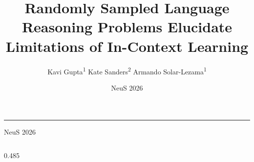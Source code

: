 \documentclass[final]{beamer}
\title{Randomly Sampled Language Reasoning Problems Elucidate Limitations of In-Context Learning}
\author{Kavi Gupta\textsuperscript{1} \quad Kate Sanders\textsuperscript{2} \quad Armando Solar-Lezama\textsuperscript{1}}
\institute{\textsuperscript{1}MIT CSAIL \qquad \textsuperscript{2}Johns Hopkins University}
\date{NeuS 2026}
\begin{document}
\begin{frame}[t]

\begin{center}
  {\inserttitle\par}
  \vspace{0.4em}
  {\color{evallmHighlight}\rule{\textwidth}{4pt}}
  \vspace{0.5em}
  {\large\insertauthor \quad\textbar\quad \insertinstitute \quad\textbar\quad NeuS 2026\par}
\end{center}
\vspace{0.8em}

\newlength{\colht}\setlength{\colht}{0.80\paperheight}

\begin{columns}[t, totalwidth=\textwidth]

\begin{column}{0.485\textwidth}
\begin{minipage}[t][\colht][t]{\linewidth}



\end{minipage}
\end{column}
\end{columns}
\end{frame}
\end{document}
